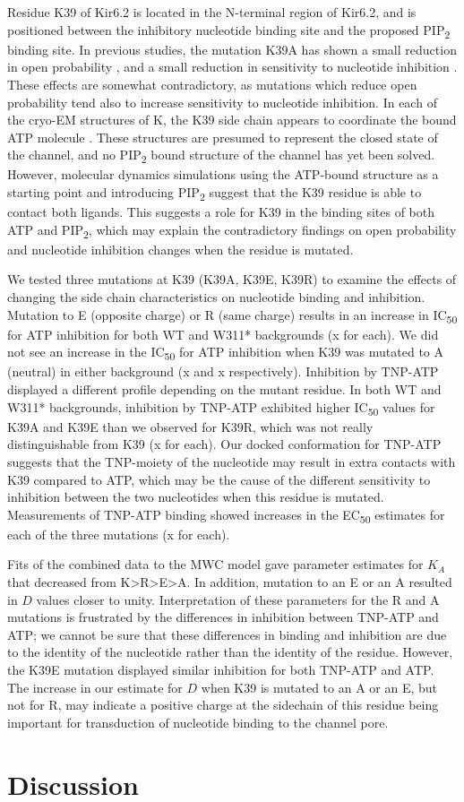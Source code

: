 Residue K39 of Kir6.2 is located in the N-terminal region of Kir6.2, and is positioned between the inhibitory nucleotide binding site and the proposed PIP\textsubscript{2} binding site.
In previous studies, the mutation K39A has shown a small reduction in open probability \cite{cukras_role_2002}, and a small reduction in sensitivity to nucleotide inhibition \cite{cukras_role_2002, tucker_molecular_1998}.
These effects are somewhat contradictory, as mutations which reduce open probability tend also to increase sensitivity to nucleotide inhibition.
In each of the cryo-EM structures of K\ATP{}, the K39 side chain appears to coordinate the bound ATP molecule \cite{lee_molecular_2017, martin_anti-diabetic_2017, li_structure_2017, puljung_cryo-electron_2018-1}.
These structures are presumed to represent the closed state of the channel, and no PIP\textsubscript{2} bound structure of the channel has yet been solved.
However, molecular dynamics simulations using the ATP-bound structure as a starting point and introducing PIP\textsubscript{2} suggest that the K39 residue is able to contact both ligands.
This suggests a role for K39 in the binding sites of both ATP and PIP\textsubscript{2}, which may explain the contradictory findings on open probability and nucleotide inhibition changes when the residue is mutated.

We tested three mutations at K39 (K39A, K39E, K39R) to examine the effects of changing the side chain characteristics on nucleotide binding and inhibition.
Mutation to E (opposite charge) or R (same charge) results in an increase in IC\textsubscript{50} for ATP inhibition for both WT and W311* backgrounds (x for each).
We did not see an increase in the IC\textsubscript{50} for ATP inhibition when K39 was mutated to A (neutral) in either background (x and x respectively).
Inhibition by TNP-ATP displayed a different profile depending on the mutant residue.
In both WT and W311* backgrounds, inhibition by TNP-ATP exhibited higher IC\textsubscript{50} values for K39A and K39E than we observed for K39R, which was not really distinguishable from K39 (x for each).
Our docked conformation for TNP-ATP suggests that the TNP-moiety of the nucleotide may result in extra contacts with K39 compared to ATP, which may be the cause of the different sensitivity to inhibition between the two nucleotides when this residue is mutated.
Measurements of TNP-ATP binding showed increases in the EC\textsubscript{50} estimates for each of the three mutations (x for each).

Fits of the combined data to the MWC model gave parameter estimates for $K_A$ that decreased from K>R>E>A.
In addition, mutation to an E or an A resulted in $D$ values closer to unity.
Interpretation of these parameters for the R and A mutations is frustrated by the differences in inhibition between TNP-ATP and ATP; we cannot be sure that these differences in binding and inhibition are due to the identity of the nucleotide rather than the identity of the residue.
However, the K39E mutation displayed similar inhibition for both TNP-ATP and ATP.
The increase in our estimate for $D$ when K39 is mutated to an A or an E, but not for R, may indicate a positive charge at the sidechain of this residue being important for transduction of nucleotide binding to the channel pore.


\section{Discussion}